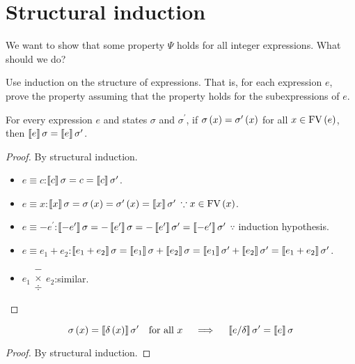 \section{Structural induction}
\begin{enumcirc}
	\item
	We want to show that some property $\Psi$ holds for all integer expressions.
	What should we do?
	\item
	Use induction on the structure of expressions.
	That is, for each expression $e$, prove the property assuming that the property
	holds for the subexpressions of $e$.
	\begin{lemma}[Coincidence]
		For every expression $e$ and states $\sigma$ and $\sigma^\prime$,
		if $\sigma\left( x \right) = \sigma^\prime\left( x \right)$ for all $x \in \textrm{FV}\left(  e  \right)$,
		then $\left\llbracket e \right\rrbracket\sigma = \left\llbracket e \right\rrbracket\sigma^\prime$.
	\end{lemma}
	\begin{proof}
		By structural induction.
		\begin{itemize}
			\item $e \equiv c$\;:\quad $\left\llbracket c \right\rrbracket\sigma = c = \left\llbracket c \right\rrbracket\sigma^\prime$.
			\item $e \equiv x$\;:\quad $\left\llbracket x \right\rrbracket\sigma = \sigma\left( x \right) =
				      \sigma^\prime\left( x \right) = \left\llbracket x \right\rrbracket\sigma^\prime$ $\because x \in \textrm{FV}\left(  x  \right)$.
			\item $e \equiv -e^\prime$\;:\quad $\left\llbracket -e^\prime \right\rrbracket\sigma =
				      -\left\llbracket e^\prime \right\rrbracket\sigma = -\left\llbracket e^\prime \right\rrbracket\sigma^\prime =
				      \left\llbracket -e^\prime \right\rrbracket\sigma^\prime$ $\because$ induction hypothesis.
			\item $e \equiv e_1 + e_2$\;:\quad $\left\llbracket e_1 + e_2 \right\rrbracket\sigma =
				      \left\llbracket e_1 \right\rrbracket\sigma + \left\llbracket e_2 \right\rrbracket\sigma =
				      \left\llbracket e_1 \right\rrbracket\sigma^\prime + \left\llbracket e_2 \right\rrbracket\sigma^\prime =
				      \left\llbracket e_1 + e_2 \right\rrbracket\sigma^\prime$.
			\item $e_1 \substack{-\\\times\\\div} e_2$\;:\quad similar.
		\end{itemize}
	\end{proof}

	\begin{lemma}[Substitution]
		\[
			\sigma\left( x \right) = \left\llbracket \delta\left( x \right) \right\rrbracket\sigma^\prime \quad \textrm{for all } x
			\quad \implies \quad \left\llbracket e/\delta \right\rrbracket\sigma^\prime = \left\llbracket e \right\rrbracket\sigma
		\]
	\end{lemma}
	\begin{proof}
		By structural induction.
	\end{proof}


\end{enumcirc}
